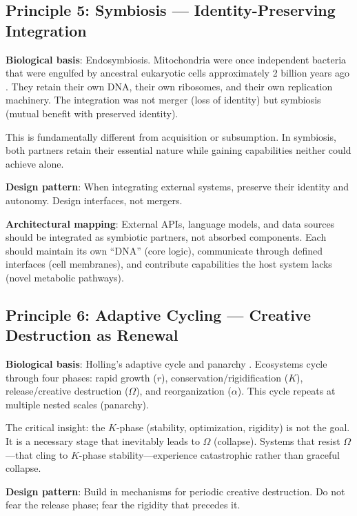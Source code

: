 \documentclass[11pt,a4paper]{article}
\begin{document}
\subsection{Principle 5: Symbiosis --- Identity-Preserving Integration}

\textbf{Biological basis}: Endosymbiosis. Mitochondria were once independent bacteria that were engulfed by ancestral eukaryotic cells approximately 2 billion years ago \citep{margulis1967}. They retain their own DNA, their own ribosomes, and their own replication machinery. The integration was not merger (loss of identity) but symbiosis (mutual benefit with preserved identity).

This is fundamentally different from acquisition or subsumption. In symbiosis, both partners retain their essential nature while gaining capabilities neither could achieve alone.

\textbf{Design pattern}: When integrating external systems, preserve their identity and autonomy. Design interfaces, not mergers.

\textbf{Architectural mapping}: External APIs, language models, and data sources should be integrated as symbiotic partners, not absorbed components. Each should maintain its own ``DNA'' (core logic), communicate through defined interfaces (cell membranes), and contribute capabilities the host system lacks (novel metabolic pathways).

\subsection{Principle 6: Adaptive Cycling --- Creative Destruction as Renewal}

\textbf{Biological basis}: Holling's adaptive cycle and panarchy \citep{holling2001}. Ecosystems cycle through four phases: rapid growth ($r$), conservation/rigidification ($K$), release/creative destruction ($\Omega$), and reorganization ($\alpha$). This cycle repeats at multiple nested scales (panarchy).

The critical insight: the $K$-phase (stability, optimization, rigidity) is not the goal. It is a necessary stage that inevitably leads to $\Omega$ (collapse). Systems that resist $\Omega$---that cling to $K$-phase stability---experience catastrophic rather than graceful collapse.

\textbf{Design pattern}: Build in mechanisms for periodic creative destruction. Do not fear the release phase; fear the rigidity that precedes it.
\end{document}
